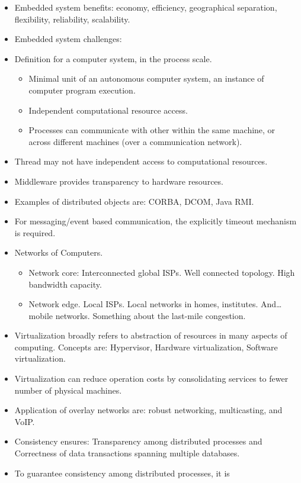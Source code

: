 \documentclass[twocolumn]{article}
\begin{document}
\begin{itemize}
\item Embedded system benefits: economy, efficiency, geographical
  separation, flexibility, reliability, scalability.
\item Embedded system challenges: 
\item Definition for a computer system, in the process scale.
  \begin{itemize}
  \item Minimal unit of an autonomous computer system, an instance of
    computer program execution.
  \item Independent computational resource access.
  \item Processes can communicate with other within the same machine,
    or across different machines (over a communication network). 
  \end{itemize}
\item Thread may not have independent access to computational
  resources. 
\item Middleware provides transparency to hardware resources.
\item Examples of distributed objects are: CORBA, DCOM, Java RMI\@.
\item For messaging/event based communication, the explicitly timeout
  mechanism is required.
\item Networks of Computers. 
  \begin{itemize}
  \item Network core: Interconnected global ISPs. Well connected
    topology. High bandwidth capacity.
  \item Network edge. Local ISPs. Local networks in homes,
    institutes. And\ldots mobile networks. Something about the
    last-mile congestion.
  \end{itemize}
\item Virtualization broadly refers to abstraction of resources in
  many aspects of computing. Concepts are: Hypervisor, Hardware
  virtualization, Software virtualization.
\item Virtualization can reduce operation costs by consolidating
  services to fewer number of physical machines.
\item Application of overlay networks are: robust networking,
  multicasting, and VoIP\@.
\item Consistency ensures: Transparency among distributed processes
  and Correctness of data transactions spanning multiple databases.
\item To guarantee consistency among distributed processes, it is

\end{itemize}
\end{document}
